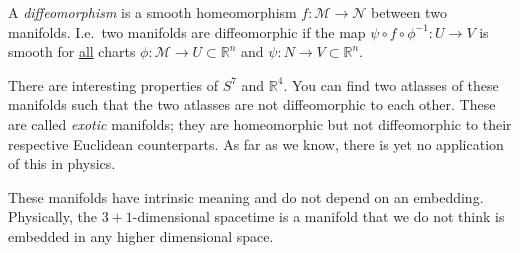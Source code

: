 \begin{definition}[Diffeomorphism]
  A \emph{diffeomorphism} is a smooth homeomorphism $f: \mathcal{M} \to \mathcal{N}$ between two manifolds.
  I.e.~two manifolds are diffeomorphic if the map $\psi \circ f \circ \phi^{-1}: U \to V$ is smooth for \underline{all} charts $\phi: \mathcal{M} \to U \subset \mathbb{R}^n$ and $\psi: N \to V \subset \mathbb{R}^n$.
\end{definition}

\begin{leftbar}
  \begin{remark}
    There are interesting properties of $S^7$ and $\mathbb{R}^{4}$. You can find two atlasses of these manifolds such that the two atlasses are not diffeomorphic to each other.
    These are called \emph{exotic} manifolds; they are homeomorphic but not diffeomorphic to their respective Euclidean counterparts.
    As far as we know, there is yet no application of this in physics.
  \end{remark}
\end{leftbar}

\begin{leftbar}
  \begin{remark}
    These manifolds have intrinsic meaning and do not depend on an embedding. Physically, the $3+1$-dimensional spacetime is a manifold that we do not think is embedded in any higher dimensional space.
  \end{remark}
\end{leftbar}




